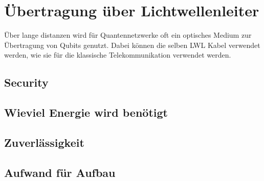 \chapter{Übertragung über Lichtwellenleiter}

Über lange distanzen wird für Quantennetzwerke oft ein optisches Medium zur Übertragung von Qubits genutzt. Dabei können die selben LWL Kabel verwendet werden, wie sie für die klassische Telekommunikation verwendet werden.

\section{Security}


\section{Wieviel Energie wird benötigt}
\section{Zuverlässigkeit}
\section{Aufwand für Aufbau}

